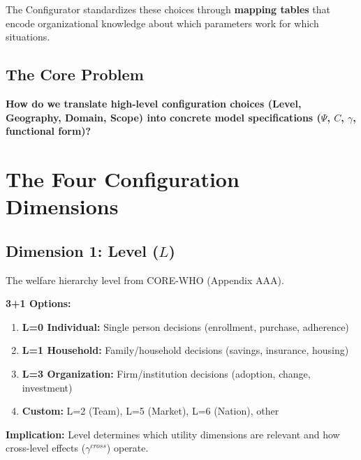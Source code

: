 The Configurator standardizes these choices through \textbf{mapping tables} that
encode organizational knowledge about which parameters work for which situations.

\subsection{The Core Problem}

\begin{tcolorbox}[colback=red!5!white, colframe=red!75!black,
    title=The Fundamental Question]
\textbf{How do we translate high-level configuration choices (Level, Geography,
Domain, Scope) into concrete model specifications ($\Psi$, $C$, $\gamma$, functional form)?}
\end{tcolorbox}


\section{The Four Configuration Dimensions}
\label{sec:ggg-dimensions}

\subsection{Dimension 1: Level ($L$)}

The welfare hierarchy level from CORE-WHO (Appendix AAA).

\begin{tcolorbox}[colback=white, colframe=black,
    title=Dimension 1: Level Selection]
\textbf{3+1 Options:}
\begin{enumerate}
\item[$\square$] \textbf{L=0 Individual:} Single person decisions (enrollment, purchase, adherence)
\item[$\square$] \textbf{L=1 Household:} Family/household decisions (savings, insurance, housing)
\item[$\square$] \textbf{L=3 Organization:} Firm/institution decisions (adoption, change, investment)
\item[$\square$] \textbf{Custom:} L=2 (Team), L=5 (Market), L=6 (Nation), other
\end{enumerate}

\textbf{Implication:} Level determines which utility dimensions are relevant and
how cross-level effects ($\gamma^{cross}$) operate.
\end{tcolorbox}

